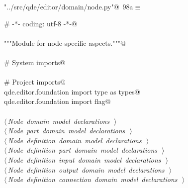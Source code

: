 \documentclass[
    a4paper,      %
    10pt,         %
    openright,    %
    notitlepage,  %
    parskip=half, %
]{scrreprt}       %
\theoremstyle{definition}                    %
\begin{document}
\begin{flushleft} \small
\begin{minipage}{\linewidth}\label{scrap157}\raggedright\small
{} \verb@"../src/qde/editor/domain/node.py"@\nobreak\ {\footnotesize {98a}}$\equiv$
\vspace{-1ex}
\begin{list}{}{} \item
\mbox{}\lstinline@# -*- coding: utf-8 -*-@\\
\mbox{}\lstinline@@\\
\mbox{}\lstinline@"""Module for node-specific aspects."""@\\
\mbox{}\lstinline@@\\
\mbox{}\lstinline@# System imports@\\
\mbox{}\lstinline@@\\
\mbox{}\lstinline@# Project imports@\\
\mbox{}\lstinline@from qde.editor.foundation import type as types@\\
\mbox{}\lstinline@from qde.editor.foundation import flag@\\
\mbox{}\lstinline@@\\
\mbox{}\lstinline@@\hbox{$\langle\,${\itshape Node domain model declarations}\nobreak\ {\footnotesize {}}$\,\rangle$}\lstinline@@\\
\mbox{}\lstinline@@\hbox{$\langle\,${\itshape Node part domain model declarations}\nobreak\ {\footnotesize {}}$\,\rangle$}\lstinline@@\\
\mbox{}\lstinline@@\hbox{$\langle\,${\itshape Node definition domain model declarations}\nobreak\ {\footnotesize {}}$\,\rangle$}\lstinline@@\\
\mbox{}\lstinline@@\hbox{$\langle\,${\itshape Node definition part domain model declarations}\nobreak\ {\footnotesize {}}$\,\rangle$}\lstinline@@\\
\mbox{}\lstinline@@\hbox{$\langle\,${\itshape Node definition input domain model declarations}\nobreak\ {\footnotesize {}}$\,\rangle$}\lstinline@@\\
\mbox{}\lstinline@@\hbox{$\langle\,${\itshape Node definition output domain model declarations}\nobreak\ {\footnotesize {}}$\,\rangle$}\lstinline@@\\
\mbox{}\lstinline@@\hbox{$\langle\,${\itshape Node definition connection domain model declarations}\nobreak\ {\footnotesize {}}$\,\rangle$}\lstinline@@\\

\end{list}
\end{minipage}
\end{flushleft}
\end{document}
